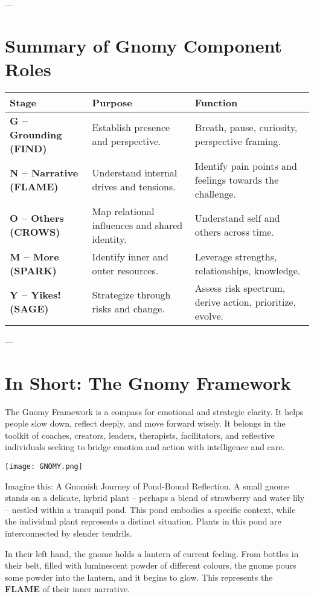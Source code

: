 \documentclass{article}
\begin{document}
---

\section{Summary of Gnomy Component Roles}
\begin{tabular}{|p{}|p{}|p{}|}
    \hline
    \textbf{Stage} & \textbf{Purpose} & \textbf{Function} \\
    \hline
    \textbf{G – Grounding (FIND)} & Establish presence and perspective. & Breath, pause, curiosity, perspective framing. \\
    \textbf{N – Narrative (FLAME)} & Understand internal drives and tensions. & Identify pain points and feelings towards the challenge. \\
    \textbf{O – Others (CROWS)} & Map relational influences and shared identity. & Understand self and others across time. \\
    \textbf{M – More (SPARK)} & Identify inner and outer resources. & Leverage strengths, relationships, knowledge. \\
    \textbf{Y – Yikes! (SAGE)} & Strategize through risks and change. & Assess risk spectrum, derive action, prioritize, evolve. \\
    \hline
\end{tabular}

---

\section{In Short: The Gnomy Framework}
The Gnomy Framework is a compass for emotional and strategic clarity. It helps people slow down, reflect deeply, and move forward wisely. It belongs in the toolkit of coaches, creators, leaders, therapists, facilitators, and reflective individuals seeking to bridge emotion and action with intelligence and care.
\begin{center}
\texttt{[image: GNOMY.png]}
\end{center}
Imagine this: A Gnomish Journey of Pond-Bound Reflection. A small gnome stands on a delicate, hybrid plant – perhaps a blend of strawberry and water lily – nestled within a tranquil pond. This pond embodies a specific context, while the individual plant represents a distinct situation. Plants in this pond are interconnected by slender tendrils.

In their left hand, the gnome holds a lantern of current feeling. From bottles in their belt, filled with luminescent powder of different colours, the gnome pours some powder into the lantern, and it begins to glow. This represents the \textbf{FLAME} of their inner narrative.
\end{document}
